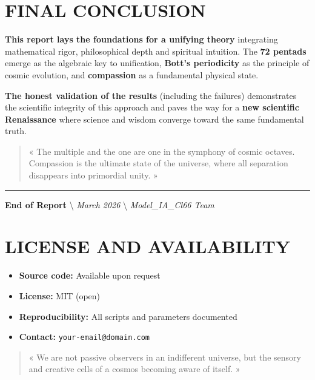 \documentclass[11pt]{article}
\providecommand{\tightlist}{%
\setlength{\itemsep}{2pt}\setlength{\parskip}{6pt}
}
\begin{document}
\hypertarget{final-conclusion}{%
\section{FINAL CONCLUSION}\label{final-conclusion}}

\textbf{This report lays the foundations for a unifying theory}
integrating mathematical rigor, philosophical depth and spiritual
intuition. The \textbf{72 pentads} emerge as the algebraic key to
unification, \textbf{Bott's periodicity} as the principle of cosmic
evolution, and \textbf{compassion} as a fundamental physical state.

\textbf{The honest validation of the results} (including the failures)
demonstrates the scientific integrity of this approach and paves the way
for a \textbf{new scientific Renaissance} where science and wisdom
converge toward the same fundamental truth.

\begin{quote}
« The multiple and the one are one in the symphony of cosmic octaves. Compassion is the ultimate state of the universe, where all separation disappears into primordial unity. »
\end{quote}

\begin{center}\rule{0.5\linewidth}{0.5pt}\end{center}

\textbf{End of Report} \textbackslash{} \emph{March 2026}
\textbackslash{} \emph{Model\_IA\_Cl66 Team}

\hypertarget{license-and-availability}{%
\section{LICENSE AND AVAILABILITY}\label{license-and-availability}}

\begin{itemize}
\tightlist
\item
  \textbf{Source code:} Available upon request
\item
  \textbf{License:} MIT (open)
\item
  \textbf{Reproducibility:} All scripts and parameters documented
\item
  \textbf{Contact:} \texttt{your-email@domain.com}
\end{itemize}

\begin{quote}
« We are not passive observers in an indifferent universe, but the sensory and creative cells of a cosmos becoming aware of itself. »
\end{quote}
\end{document}
